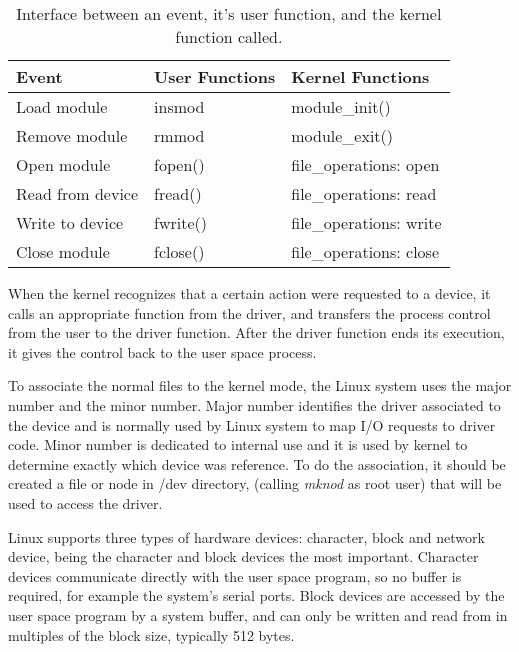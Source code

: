 \begin{table}[H]
	\centering
	\resizebox{\columnwidth}{!}
	{
		\begin{tabular}{|m{4cm}|m{3.5cm}|m{5cm}|}
			\hline
			\textbf{Event} & \textbf{User Functions} & \textbf{Kernel Functions}
			\\\hline\hline
			Load module & insmod & module\_init()
			\\\hline
			Remove module & rmmod & module\_exit()
			\\\hline
			Open module & fopen() & file\_operations: open
			\\\hline
			Read from device & fread() & file\_operations: read
			\\\hline
			Write to device & fwrite() & file\_operations: write
			\\\hline
			Close module & fclose() & file\_operations: close
			\\\hline
		\end{tabular}
	}
	\caption{Interface between an event, it's user function, and the kernel function called.}
	\label{table:device_driver}
\end{table}

When the kernel recognizes that a certain action were requested to a device, it calls an appropriate function from the driver, and transfers the process control from the user to the driver function. After the driver function ends its execution, it gives the control back to the user space process.

To associate the normal files to the kernel mode, the Linux system uses the major number and the minor number. Major number identifies the driver associated to the device and is normally used by Linux system to map I/O requests to driver code. Minor number is dedicated to internal use and it is used by kernel to determine exactly which device was reference. To do the association, it should be created a file or node in /dev directory, (calling \textit{mknod} as root user) that will be used to access the driver.

Linux supports three types of hardware devices: character, block and network device, being the character and block devices the most important. Character devices communicate directly with the user space program, so no buffer is required, for example the system’s serial ports. Block devices are accessed by the user space program by a system buffer, and can only be written and read from in multiples of the block size, typically 512 bytes. \cite{linux_progr_interface}

